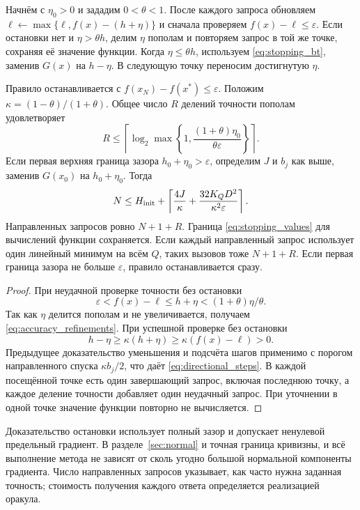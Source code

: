 Начнём с $\eta_0>0$ и зададим $0<\theta<1$.
После каждого запроса обновляем
$\ell\leftarrow\max\{\ell,f(x)-(h+\eta)\}$ и сначала проверяем
$f(x)-\ell\le\varepsilon$. Если остановки нет и $\eta>\theta h$,
делим $\eta$ пополам и повторяем запрос в той же точке, сохраняя
её значение функции. Когда $\eta\le\theta h$, используем
\eqref{eq:stopping_bt}, заменив $G(x)$ на $h-\eta$.
В следующую точку переносим достигнутую $\eta$.

\begin{corollary}
\label{cor:directional_stopping}
Правило останавливается с $f(x_N)-f(x^*)\le\varepsilon$.
Положим $\kappa=(1-\theta)/(1+\theta)$. Общее число $R$ делений
точности пополам удовлетворяет
\begin{equation}\label{eq:accuracy_refinements}
 R\le\left\lceil\log_2\max\left\{1,
 \frac{(1+\theta)\eta_0}{\theta\varepsilon}\right\}\right\rceil.
\end{equation}
Если первая верхняя граница зазора $h_0+\eta_0>\varepsilon$,
определим $J$ и $b_j$ как выше, заменив $G(x_0)$ на $h_0+\eta_0$.
Тогда
\begin{equation}\label{eq:directional_steps}
 N\le H_{\rm init}+\left\lceil
 \frac{4J}{\kappa}+\frac{32K_QD^2}{\kappa^2\varepsilon}
 \right\rceil.
\end{equation}
Направленных запросов ровно $N+1+R$. Граница
\eqref{eq:stopping_values} для вычислений функции сохраняется.
Если каждый направленный запрос использует один линейный минимум
на всём $Q$, таких вызовов тоже $N+1+R$.
Если первая граница зазора не больше $\varepsilon$, правило
останавливается сразу.
\end{corollary}
\begin{proof}
При неудачной проверке точности без остановки
\[
 \varepsilon<f(x)-\ell\le h+\eta
 <(1+\theta)\eta/\theta.
\]
Так как $\eta$ делится пополам и не увеличивается, получаем
\eqref{eq:accuracy_refinements}. При успешной проверке без остановки
\[
 h-\eta\ge\kappa(h+\eta)\ge\kappa(f(x)-\ell)>0.
\]
Предыдущее доказательство уменьшения и подсчёта шагов применимо
с порогом направленного спуска $\kappa b_j/2$, что даёт
\eqref{eq:directional_steps}. В каждой посещённой точке есть один
завершающий запрос, включая последнюю точку, а каждое деление
точности добавляет один неудачный запрос. При уточнении в одной
точке значение функции повторно не вычисляется.
\end{proof}

Доказательство остановки использует полный зазор и допускает
ненулевой предельный градиент. В разделе~\ref{sec:normal} и точная
граница кривизны, и всё выполнение метода не зависят от сколь угодно
большой нормальной компоненты градиента. Число направленных запросов
указывает, как часто нужна заданная точность; стоимость получения
каждого ответа определяется реализацией оракула.
